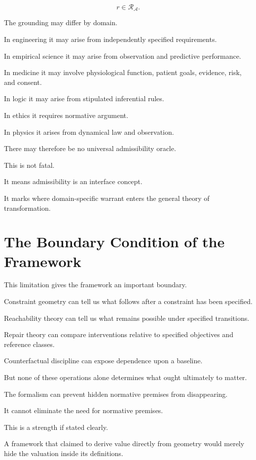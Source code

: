 \documentclass[11pt]{article}
\theoremstyle{remark}
\newcommand{\Adm}{\mathcal{A}}
\begin{document}
\begin{equation}
r\in\mathcal{R}_{\Adm}.
\end{equation}

The grounding may differ by domain.

In engineering it may arise from independently specified requirements.

In empirical science it may arise from observation and predictive performance.

In medicine it may involve physiological function, patient goals, evidence,
risk, and consent.

In logic it may arise from stipulated inferential rules.

In ethics it requires normative argument.

In physics it arises from dynamical law and observation.

There may therefore be no universal admissibility oracle.

This is not fatal.

It means admissibility is an interface concept.

It marks where domain-specific warrant enters the general theory of
transformation.

\section{The Boundary Condition of the Framework}

This limitation gives the framework an important boundary.

Constraint geometry can tell us what follows after a constraint has been
specified.

Reachability theory can tell us what remains possible under specified
transitions.

Repair theory can compare interventions relative to specified objectives and
reference classes.

Counterfactual discipline can expose dependence upon a baseline.

But none of these operations alone determines what ought ultimately to matter.

The formalism can prevent hidden normative premises from disappearing.

It cannot eliminate the need for normative premises.

This is a strength if stated clearly.

A framework that claimed to derive value directly from geometry would merely
hide the valuation inside its definitions.
\end{document}

